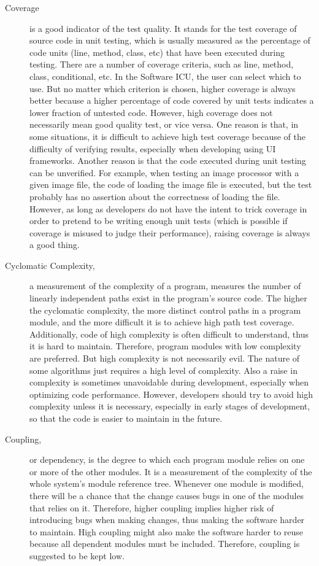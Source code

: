 \begin{description}
\item[Coverage] 
is a good indicator of the test quality. It stands for the test coverage of source code in unit testing, which is usually measured as the percentage of code units (line, method, class, etc) that have been executed during testing. There are a number of coverage criteria, such as line, method, class, conditional, etc. In the Software ICU, the user can select which to use. But no matter which criterion is chosen, higher coverage is always better because a higher percentage of code covered by unit tests indicates a lower fraction of untested code. However, high coverage does not necessarily mean good quality test, or vice versa. One reason is that, in some situations, it is difficult to achieve high test coverage because of the difficulty of verifying results, especially when developing using UI frameworks. Another reason is that the code executed during unit testing can be unverified. For example, when testing an image processor with a given image file, the code of loading the image file is executed, but the test probably has no assertion about the correctness of loading the file. However, as long as developers do not have the intent to trick coverage in order to pretend to be writing enough unit tests (which is possible if coverage is misused to judge their performance), raising coverage is always a good thing.

\item[Cyclomatic Complexity,] a measurement of the complexity of a program, measures the number of linearly independent paths exist in the program's source code\cite{mccabe:complexity}. The higher the cyclomatic complexity, the more distinct control paths in a program module, and the more difficult it is to achieve high path test coverage. Additionally, code of high complexity is often difficult to understand, thus it is hard to maintain. Therefore, program modules  with low complexity are preferred. But high complexity is not necessarily evil. The nature of some algorithms just requires a high level of complexity. Also a raise in complexity is sometimes unavoidable during development, especially when optimizing code performance. However, developers should try to avoid high complexity unless it is necessary, especially in early stages of development, so that the code is easier to maintain in the future.

\item[Coupling,] or dependency, is the degree to which each program module relies on one or more of the other modules. It is a measurement of the complexity of the whole system's module reference tree. Whenever one module is modified, there will be a chance that the change causes bugs in one of the modules that relies on it. Therefore, higher coupling implies higher risk of introducing bugs when making changes, thus making the software harder to maintain. High coupling might also make the software harder to reuse because all dependent modules must be included. Therefore, coupling is suggested to be kept low.


\end{description}
